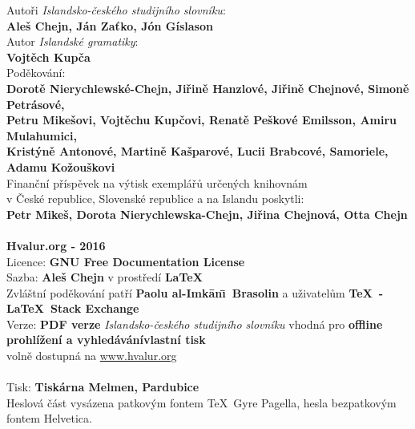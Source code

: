 \noindent\begin{minipage}[t][\textheight][t]{\textwidth}
Autoři \textit{Islandsko-českého studijního slovníku}:\\
  \textbf{Aleš Chejn, Ján Zaťko, Jón Gíslason}\\[\baselineskip]
\ifPDF
\else
Autor \textit{Islandské gramatiky}:\\
  \textbf{Vojtěch Kupča}\\[\baselineskip]
\fi
Poděkování:\\
  \textbf{Dorotě Nierychlewské-Chejn, Jiřině Hanzlové, Jiřině Chejnové,
          Simoně Petrásové,\\ Petru Mikešovi, Vojtěchu Kupčovi, 
          Renatě Peškové Emilsson, Amiru Mulahumici, \\ Kristýně Antonové, 
          Martině Kašparové, Lucii Brabcové, Samoriele, Adamu Kožouškovi}\\[\baselineskip]
Finanční příspěvek na výtisk exemplářů určených knihovnám\\ v České republice,
Slovenské republice a na Islandu poskytli:\\
  \textbf{Petr Mikeš, Dorota Nierychlewska-Chejn, Jiřina Chejnová, Otta Chejn}
  \ifPDF
  \\[39\baselineskip]
  \else
  \\[36\baselineskip]
  \fi
\textbf{Hvalur.org - 2016}\\
Licence: \textbf{GNU Free Documentation License}\\
Sazba: \textbf{Aleš Chejn} v prostředí  \textbf\LaTeX\\
  Zvláštní poděkování patří \textbf{Paolu al-Imk\=an\=\i\ Brasolin} a uživatelům  \textbf{\TeX\ - \LaTeX\ Stack Exchange}\\[\baselineskip]
\ifPDF
Verze: \textbf{PDF verze} \textit{Islandsko-českého studijního slovníku} vhodná pro \textbf{\ifscreen offline prohlížení a vyhledávání\else vlastní tisk\fi}\\ volně dostupná na \url{www.hvalur.org}\\[\baselineskip]
\else
\textbf\ISBN\\[\baselineskip]
\fi
\ifPDF
\else
Tisk: \textbf{Tiskárna Melmen, Pardubice}\\
\fi
Heslová část vysázena patkovým fontem \TeX\ Gyre Pagella,
hesla bezpatkovým fontem {\phvfamily Helvetica}.
\end{minipage}


